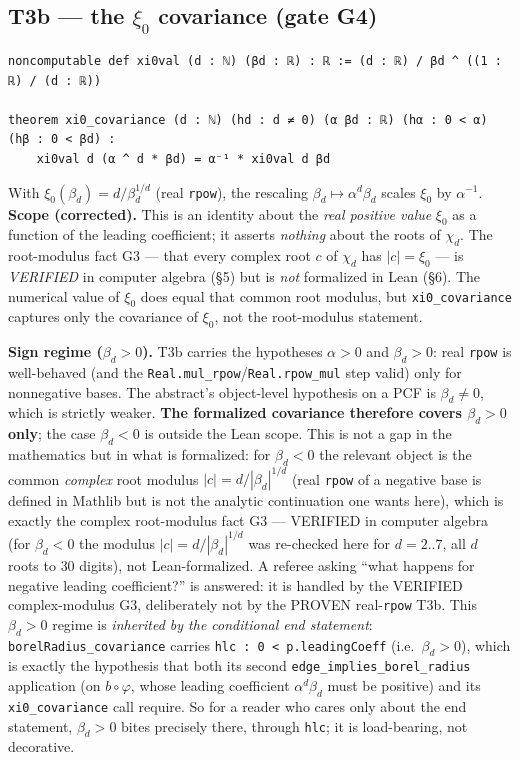 \documentclass[11pt]{article}
\newcommand{\xizero}{\xi_{0}}
\begin{document}
\subsection*{T3b --- the $\xizero$ covariance (gate G4)}
\begin{lstlisting}
noncomputable def xi0val (d : ℕ) (βd : ℝ) : ℝ := (d : ℝ) / βd ^ ((1 : ℝ) / (d : ℝ))

theorem xi0_covariance (d : ℕ) (hd : d ≠ 0) (α βd : ℝ) (hα : 0 < α) (hβ : 0 < βd) :
    xi0val d (α ^ d * βd) = α⁻¹ * xi0val d βd
\end{lstlisting}
With $\xizero(\beta_d)=d/\beta_d^{1/d}$ (real \texttt{rpow}), the rescaling
$\beta_d\mapsto\alpha^{d}\beta_d$ scales $\xizero$ by $\alpha^{-1}$.
\textbf{Scope (corrected).} This is an identity about the \emph{real positive
value} $\xizero$ as a function of the leading coefficient; it asserts
\emph{nothing} about the roots of $\chi_d$. The root-modulus fact G3 --- that
every complex root $c$ of $\chi_d$ has $|c|=\xizero$ --- is \emph{VERIFIED} in
computer algebra (\S5) but is \emph{not} formalized in Lean (\S6). The numerical
value of $\xizero$ does equal that common root modulus, but
\texttt{xi0\_covariance} captures only the covariance of $\xizero$, not the
root-modulus statement.

\textbf{Sign regime ($\beta_d>0$).} T3b carries the hypotheses
$\alpha>0$ and $\beta_d>0$: real \texttt{rpow} is well-behaved (and the
\texttt{Real.mul\_rpow}/\texttt{Real.rpow\_mul} step valid) only for nonnegative
bases. The abstract's object-level hypothesis on a PCF is $\beta_d\neq0$, which
is strictly weaker. \textbf{The formalized covariance therefore covers
$\beta_d>0$ only}; the case $\beta_d<0$ is outside the Lean scope. This is not a
gap in the mathematics but in what is formalized: for $\beta_d<0$ the relevant
object is the common \emph{complex} root modulus
$|c|=d/|\beta_d|^{1/d}$ (real \texttt{rpow} of a negative base is defined in
Mathlib but is not the analytic continuation one wants here), which is exactly
the complex root-modulus fact G3 --- VERIFIED in computer algebra (for
$\beta_d<0$ the modulus $|c|=d/|\beta_d|^{1/d}$ was re-checked here for
$d=2..7$, all $d$ roots to $30$ digits), not Lean-formalized. A referee asking
``what happens for negative leading coefficient?'' is answered: it is handled by
the VERIFIED complex-modulus G3, deliberately not by the PROVEN
real-\texttt{rpow} T3b. This $\beta_d>0$ regime is \emph{inherited by the
conditional end statement}: \texttt{borelRadius\_covariance} carries
\texttt{hlc : 0 < p.leadingCoeff} (i.e.\ $\beta_d>0$), which is exactly the
hypothesis that both its second \texttt{edge\_implies\_borel\_radius} application
(on $b\circ\varphi$, whose leading coefficient $\alpha^{d}\beta_d$ must be
positive) and its \texttt{xi0\_covariance} call require. So for a reader who
cares only about the end statement, $\beta_d>0$ bites precisely there, through
\texttt{hlc}; it is load-bearing, not decorative.
\end{document}
